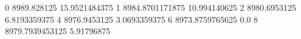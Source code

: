 0 8989.828125 15.9521484375
1 8984.8701171875 10.994140625
2 8980.6953125 6.8193359375
4 8976.9453125 3.0693359375
6 8973.8759765625 0.0
8 8979.7939453125 5.91796875
